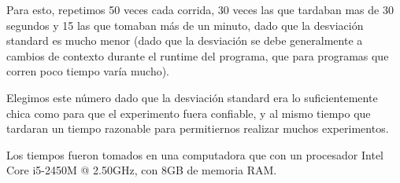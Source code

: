Para esto, repetimos 50 veces cada corrida, 30 veces las que tardaban mas de 30 segundos y 15 las que tomaban más de un minuto, dado que la desviación standard es mucho menor (dado que la desviación se debe generalmente a cambios de contexto durante el runtime del programa, que para programas que corren poco tiempo varía mucho).

Elegimos este número dado que la desviación standard era lo suficientemente chica como para que el experimento fuera confiable, y al mismo tiempo que tardaran un tiempo razonable para permitiernos realizar muchos experimentos.

Los tiempos fueron tomados en una computadora que con un procesador Intel Core i5-2450M @ 2.50GHz, con 8GB de memoria RAM.
